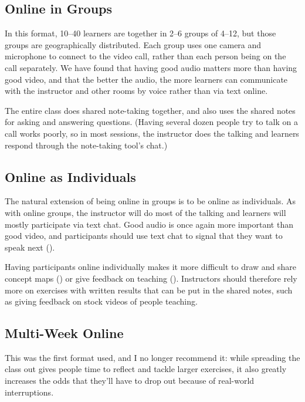 \subsection*{Online in Groups}

In this format, 10--40 learners are together in 2--6 groups of 4--12,
but those groups are geographically distributed.  Each group uses one
camera and microphone to connect to the video call, rather than each
person being on the call separately. We have found that having good
audio matters more than having good video, and that the better the
audio, the more learners can communicate with the instructor and other
rooms by voice rather than via text online.

The entire class does shared note-taking together, and also uses the
shared notes for asking and answering questions.  (Having several
dozen people try to talk on a call works poorly, so in most sessions,
the instructor does the talking and learners respond through the
note-taking tool's chat.)

\subsection*{Online as Individuals}

The natural extension of being online in groups is to be online as
individuals.  As with online groups, the instructor will do most of
the talking and learners will mostly participate via text chat.  Good
audio is once again more important than good video, and participants
should use text chat to signal that they want to speak next
().

Having participants online individually makes it more difficult to
draw and share concept maps () or give
feedback on teaching ().  Instructors
should therefore rely more on exercises with written results that can
be put in the shared notes, such as giving feedback on stock videos of
people teaching.

\subsection*{Multi-Week Online}

This was the first format used, and I no longer recommend it: while
spreading the class out gives people time to reflect and tackle larger
exercises, it also greatly increases the odds that they'll have to
drop out because of real-world interruptions.

